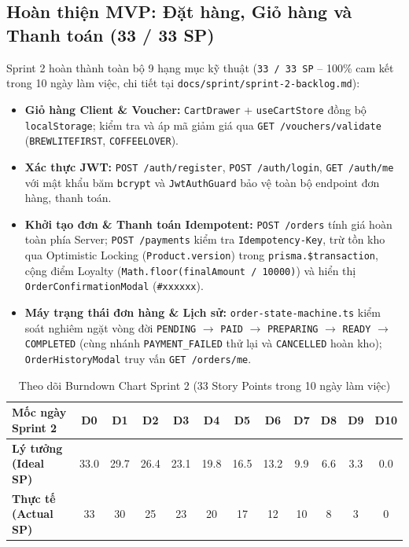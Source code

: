 \documentclass[a4paper,12pt]{article}
\begin{document}
\subsection{Hoàn thiện MVP: Đặt hàng, Giỏ hàng và Thanh toán (33 / 33 SP)}
Sprint 2 hoàn thành toàn bộ 9 hạng mục kỹ thuật (\texttt{33 / 33 SP} -- 100\% cam kết trong 10 ngày làm việc, chi tiết tại \texttt{docs/sprint/sprint-2-backlog.md}):
\begin{itemize}
  \item \textbf{Giỏ hàng Client \& Voucher:} \texttt{CartDrawer} + \texttt{useCartStore} đồng bộ \texttt{localStorage}; kiểm tra và áp mã giảm giá qua \texttt{GET /vouchers/validate} (\texttt{BREWLITEFIRST}, \texttt{COFFEELOVER}).
  \item \textbf{Xác thực JWT:} \texttt{POST /auth/register}, \texttt{POST /auth/login}, \texttt{GET /auth/me} với mật khẩu băm \texttt{bcrypt} và \texttt{JwtAuthGuard} bảo vệ toàn bộ endpoint đơn hàng, thanh toán.
  \item \textbf{Khởi tạo đơn \& Thanh toán Idempotent:} \texttt{POST /orders} tính giá hoàn toàn phía Server; \texttt{POST /payments} kiểm tra \texttt{Idempotency-Key}, trừ tồn kho qua Optimistic Locking (\texttt{Product.version}) trong \texttt{prisma.\$transaction}, cộng điểm Loyalty (\texttt{Math.floor(finalAmount / 10000)}) và hiển thị \texttt{OrderConfirmationModal} (\texttt{\#xxxxxx}).
  \item \textbf{Máy trạng thái đơn hàng \& Lịch sử:} \texttt{order-state-machine.ts} kiểm soát nghiêm ngặt vòng đời \texttt{PENDING} $\rightarrow$ \texttt{PAID} $\rightarrow$ \texttt{PREPARING} $\rightarrow$ \texttt{READY} $\rightarrow$ \texttt{COMPLETED} (cùng nhánh \texttt{PAYMENT\_FAILED} thử lại và \texttt{CANCELLED} hoàn kho); \texttt{OrderHistoryModal} truy vấn \texttt{GET /orders/me}.
\end{itemize}

\begin{table}[h!]
\centering
\scriptsize
\begin{tabular}{|l|c|c|c|c|c|c|c|c|c|c|c|}
\hline
\textbf{Mốc ngày Sprint 2} & \textbf{D0} & \textbf{D1} & \textbf{D2} & \textbf{D3} & \textbf{D4} & \textbf{D5} & \textbf{D6} & \textbf{D7} & \textbf{D8} & \textbf{D9} & \textbf{D10} \\
\hline
\textbf{Lý tưởng (Ideal SP)} & 33.0 & 29.7 & 26.4 & 23.1 & 19.8 & 16.5 & 13.2 & 9.9 & 6.6 & 3.3 & 0.0 \\
\hline
\textbf{Thực tế (Actual SP)} & 33 & 30 & 25 & 23 & 20 & 17 & 12 & 10 & 8 & 3 & 0 \\
\hline
\end{tabular}
\caption{Theo dõi Burndown Chart Sprint 2 (33 Story Points trong 10 ngày làm việc)}
\end{table}
\end{document}
